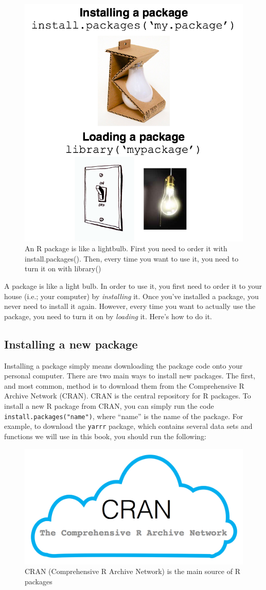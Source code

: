 \documentclass[
]{book}
\begin{document}
\begin{figure}

{\centering \includegraphics[width=0.5\linewidth]{images/packagebulb} 

}

\caption{An R package is like a lightbulb. First you need to order it with install.packages(). Then, every time you want to use it, you need to turn it on with library()}\label{fig:package}
\end{figure}

A package is like a light bulb. In order to use it, you first need to order it to your house (i.e.; your computer) by \emph{installing} it. Once you've installed a package, you never need to install it again. However, every time you want to actually use the package, you need to turn it on by \emph{loading} it. Here's how to do it.

\hypertarget{installing-a-new-package}{%
\subsection{Installing a new package}\label{installing-a-new-package}}

Installing a package simply means downloading the package code onto your personal computer. There are two main ways to install new packages. The first, and most common, method is to download them from the Comprehensive R Archive Network (CRAN). CRAN is the central repository for R packages. To install a new R package from CRAN, you can simply run the code \texttt{install.packages("name")}, where ``name'' is the name of the package. For example, to download the \texttt{yarrr} package, which contains several data sets and functions we will use in this book, you should run the following:

\begin{figure}

{\centering \includegraphics[width=0.5\linewidth]{images/cran} 

}

\caption{CRAN (Comprehensive R Archive Network) is the main source of R packages}\label{fig:cran}
\end{figure}
\end{document}
